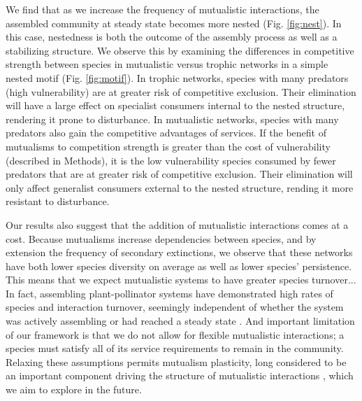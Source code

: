 \documentclass[9pt,twocolumn,twoside]{pnas-new}
\begin{document}
We find that as we increase the frequency of mutualistic interactions, the assembled community at steady state becomes more nested (Fig. \ref{fig:nest}).
In this case, nestedness is both the outcome of the assembly process as well as a stabilizing structure.
We observe this by examining the differences in competitive strength between species in mutualistic versus trophic networks in a simple nested motif (Fig. \ref{fig:motif}).
In trophic networks, species with many predators (high vulnerability) are at greater risk of competitive exclusion.
Their elimination will have a large effect on specialist consumers internal to the nested structure, rendering it prone to disturbance.
In mutualistic networks, species with many predators also gain the competitive advantages of services.
If the benefit of mutualisms to competition strength is greater than the cost of vulnerability (described in Methods), it is the low vulnerability species consumed by fewer predators that are at greater risk of competitive exclusion.
Their elimination will only affect generalist consumers external to the nested structure, rending it more resistant to disturbance.


Our results also suggest that the addition of mutualistic interactions comes at a cost.
Because mutualisms increase dependencies between species, and by extension the frequency of secondary extinctions, we observe that these networks have both lower species diversity on average as well as lower species' persistence.
This means that we expect mutualistic systems to have greater species turnover...
In fact, assembling plant-pollinator systems have demonstrated high rates of species and interaction turnover, seemingly independent of whether the system was actively assembling or had reached a steady state \cite{Ponisio2017}.
And important limitation of our framework is that we do not allow for flexible mutualistic interactions; a species must satisfy all of its service requirements to remain in the community.
Relaxing these assumptions permits mutualism plasticity, long considered to be an important component driving the structure of mutualistic interactions \cite{Ramos2012,Valdovinos2016,Ponisio2017}, which we aim to explore in the future.\\
\end{document}
